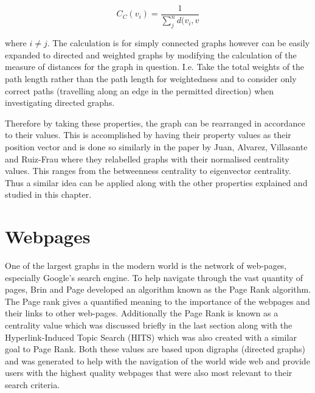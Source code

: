 \begin{equation}\label{eq:cce}
C_C(v_i) = \frac{1}{\sum_{j}^nd(v_i, v}
\end{equation}

where $i \ne j$. The calculation is for simply connected graphs however can be easily expanded to directed and weighted graphs by modifying the calculation of the measure of distances for the graph in question. I.e. Take the total weights of the path length rather than the path length for weightedness and to consider only correct paths (travelling along an edge in the permitted direction) when investigating directed graphs.

Therefore by taking these properties, the graph can be rearranged in accordance to their values. This is accomplished by having their property values as their position vector and is done so similarly in the paper by Juan, Alvarez, Villasante and Ruiz-Frau\cite{de2021graph} where they relabelled graphs with their normalised centrality values. This ranges from the betweenness centrality to eigenvector centrality. Thus a similar idea can be applied along with the other properties explained and studied in this chapter.

\section{Webpages}
One of the largest graphs in the modern world is the network of web-pages, especially Google's search engine. To help navigate through the vast quantity of pages, Brin and Page\cite{brin1998anatomy} developed an algorithm known as the Page Rank algorithm. The Page rank gives a quantified meaning to the importance of the webpages and their links to other web-pages. Additionally the Page Rank is known as a centrality value which was discussed briefly in the last section along with the Hyperlink-Induced Topic Search (HITS) which was also created with a similar goal to Page Rank. Both these values are based upon digraphs (directed graphs) and was generated to help with the navigation of the world wide web and provide users with the highest quality webpages that were also most relevant to their search criteria.

